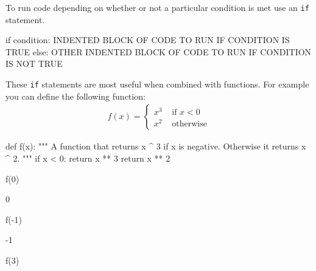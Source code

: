 To run code depending on whether or not a particular condition is met use
an \texttt{if} statement.


\begin{pyin}
if condition:
    INDENTED BLOCK OF CODE TO RUN IF CONDITION IS TRUE
else:
    OTHER INDENTED BLOCK OF CODE TO RUN IF CONDITION IS NOT TRUE
\end{pyin}



These \texttt{if} statements are most useful when combined with functions. For example
you can define the following function:
\begin{equation*}
\begin{split}
    f(x) = \begin{cases}
            x ^ 3&\text{ if }x < 0\\
            x ^ 2&\text{ otherwise}
            \end{cases}
\end{split}
\end{equation*}



\begin{pyin}
def f(x):
    """
    A function that returns x ^ 3 if x is negative.
    Otherwise it returns x ^ 2.
    """
    if x < 0:
        return x ** 3
    return x ** 2
\end{pyin}







\begin{pyin}
f(0)
\end{pyin}





\begin{raw}
0
\end{raw}







\begin{pyin}
f(-1)
\end{pyin}





\begin{raw}
-1
\end{raw}







\begin{pyin}
f(3)
\end{pyin}





